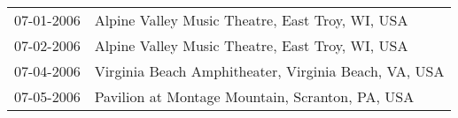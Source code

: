 \begin{supertabular}{ll}
 07-01-2006 &       Alpine Valley Music Theatre, East Troy, WI, USA \\
 07-02-2006 &       Alpine Valley Music Theatre, East Troy, WI, USA \\
 07-04-2006 &  Virginia Beach Amphitheater, Virginia Beach, VA, USA \\
 07-05-2006 &       Pavilion at Montage Mountain, Scranton, PA, USA \\
\end{supertabular}
